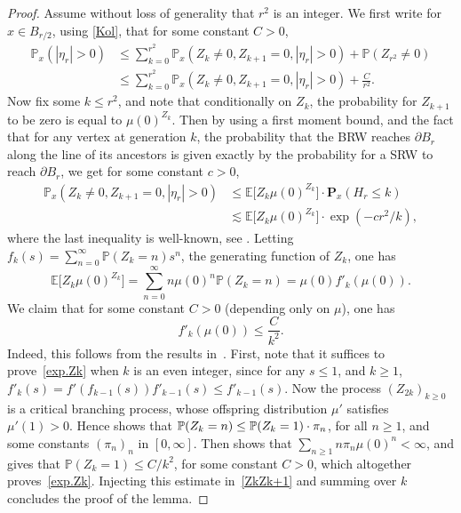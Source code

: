 \begin{proof}
Assume without loss of generality that $r^2$ is an integer. We first write for $x\in B_{r/2}$, using \eqref{Kol}, that for some constant $C>0$,
\begin{align*}
\mathbb P_x(|\eta_r| >0 ) & \le \sum_{k=0}^{r^2} \mathbb P_x(Z_k\neq 0, Z_{k+1}=0, |\eta_r|>0) + \mathbb P(Z_{r^2} \neq 0) \\
& \le\sum_{k=0}^{r^2} \mathbb P_x(Z_k\neq 0, Z_{k+1}=0, |\eta_r|>0) + \frac{C}{r^2}.
\end{align*}
Now fix some $k\le r^2$, and note that conditionally on $Z_k$, the probability for $Z_{k+1}$ to be zero is equal to $\mu(0)^{Z_k}$. Then by using a first moment bound, and the fact that for any vertex at generation $k$, the probability that the BRW reaches $\partial B_r$ along the line of its ancestors is given exactly by the probability for a SRW to reach $\partial B_r$, we get for some constant $c>0$,
\begin{align} \label{ZkZk+1}
\nonumber \mathbb P_x(Z_k\neq 0, Z_{k+1}=0, |\eta_r|>0) & \le \mathbb E\big[Z_k \mu(0)^{Z_k}\big]\cdot \mathbf P_x(H_r\le k) \\
& \lesssim \mathbb E\big[Z_k \mu(0)^{Z_k}\big]\cdot \exp(-cr^2/k),
\end{align}
where the last inequality is well-known, see \eg \cite[Prop.\,2.1.2]{LL10}. Letting $f_k(s) = \sum_{n=0}^\infty \mathbb P(Z_k=n)s^n$, the generating function of $Z_k$, one has
\[
\mathbb E\big[Z_k \mu(0)^{Z_k}\big] = \sum_{n=0}^\infty n\mu(0)^n \mathbb P(Z_k=n) = \mu(0) f'_k(\mu(0)).
\]
We claim that for some constant $C>0$ (depending only on $\mu$), one has
\begin{equation}\label{exp.Zk}
f'_k(\mu(0)) \le \frac C{k^2}.
\end{equation}
Indeed, this follows from the results in~\cite{AN}. First, note that it suffices to prove~\eqref{exp.Zk} when $k$ is an even integer, since for any $s\le 1$, and $k\ge 1$, $f'_k(s) = f'(f_{k-1}(s)) f'_{k-1}(s)\le f'_{k-1}(s)$.
Now the process $(Z_{2k})_{k\ge 0}$ is a critical branching process, whose offspring distribution $\mu'$ satisfies $\mu'(1) >0$.
Hence \cite[Lem.\,2 p.\,12]{AN} shows that $\mathbb P(Z_k=\nobreak n) \le \mathbb P(Z_k=1)\cdot \pi_n$, for all $n\ge 1$, and some constants $(\pi_n)_n$ in $[0,\infty]$. Then \cite[Th.\,2 p.\,13]{AN} shows that $\sum_{n\ge 1} n\pi_n\mu(0)^n <\infty$, and \cite[Cor.\,2 p.\,23]{AN} gives that $\mathbb P(Z_k=1) \le C/k^2$, for some constant $C>0$, which altogether proves~\eqref{exp.Zk}. Injecting this estimate in~\eqref{ZkZk+1} and summing over $k$ concludes the proof of the lemma.
\end{proof}

